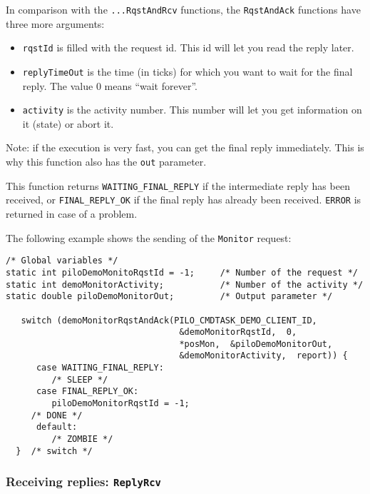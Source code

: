 In comparison with the \texttt{...RqstAndRcv} functions, the 
\texttt{RqstAndAck} functions have three more arguments:

\begin{itemize}
\item \texttt{rqstId} is filled with the request id. This id will let you
read the reply later.

\item \texttt{replyTimeOut} is the time (in ticks) for which you want to
wait for the final reply. The value $0$ means ``wait forever''. 

\item \texttt{activity} is the activity number. This number will let you get
information on it (state) or abort it.
\end{itemize}

Note: if    the execution is  very   fast, you can   get the  final reply
immediately. This is why this function also has the \texttt{out} parameter.

This function returns \texttt{WAITING\_FINAL\_REPLY} if the   intermediate
reply has been received, or \texttt{FINAL\_REPLY\_OK} if the final reply has
already been received. \texttt{ERROR} is returned in case of a problem.

\bigbreak

The following example shows the sending of the \texttt{Monitor} request:

\begin{center}\begin{cartouche}\small\begin{verbatim}
/* Global variables */
static int piloDemoMonitoRqstId = -1;     /* Number of the request */
static int demoMonitorActivity;           /* Number of the activity */
static double piloDemoMonitorOut;         /* Output parameter */

   switch (demoMonitorRqstAndAck(PILO_CMDTASK_DEMO_CLIENT_ID, 
                                  &demoMonitorRqstId,  0,
                                  *posMon,  &piloDemoMonitorOut, 
                                  &demoMonitorActivity,  report)) {
      case WAITING_FINAL_REPLY:
         /* SLEEP */
      case FINAL_REPLY_OK:
         piloDemoMonitorRqstId = -1;
	 /* DONE */
      default:
         /* ZOMBIE */
  }  /* switch */
\end{verbatim}\end{cartouche}\end{center}


\subsubsection{Receiving replies: \texttt{ReplyRcv}}

